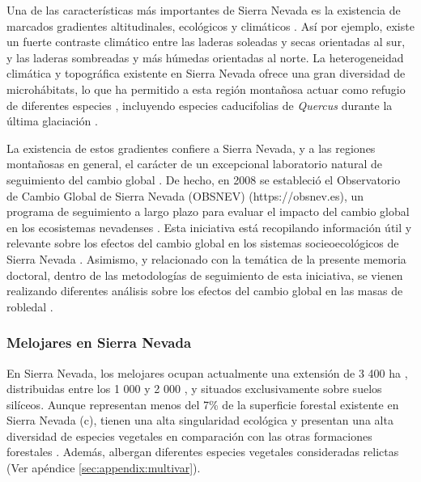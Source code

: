 Una de las características más importantes de Sierra Nevada es la existencia de marcados gradientes altitudinales, ecológicos y climáticos \autocite{Zamoraetal2021UniendoMacro}. Así por ejemplo, existe un fuerte contraste climático entre las laderas soleadas y secas orientadas al sur, y las laderas sombreadas y más húmedas orientadas al norte. La heterogeneidad climática y topográfica existente en Sierra Nevada ofrece una gran diversidad de microhábitats, lo que ha permitido a esta región montañosa actuar como refugio de diferentes especies \autocites{MedailDiadema2009GlacialRefugia,GomezLunt2007RefugiaRefugia,BlancoPastoretal2019TopographyExplains}, incluyendo especies caducifolias de \emph{Quercus} durante la última glaciación \autocites{Olaldeetal2002WhiteOaks,RodriguezSanchezetal2010TreeRange,Petitetal2002IdentificationRefugia}. 

La existencia de estos gradientes confiere a Sierra Nevada, y a las regiones montañosas en general, el carácter de un excepcional laboratorio natural de seguimiento del cambio global \autocite{Zamora2010AreasProtegidas,Zamoraetal2017MonitoringGlobal}. De hecho, en 2008 se estableció el Observatorio de Cambio Global de Sierra Nevada (OBSNEV) (https://obsnev.es), un programa de seguimiento a largo plazo para evaluar el impacto del cambio global en los ecosistemas nevadenses \autocites{Aspizuaetal2010ObservatorioCambio,BonetGarciaetal2011SierraNevada}. Esta iniciativa está recopilando información útil y relevante sobre los efectos del cambio global en los sistemas socieoecológicos de Sierra Nevada \autocites{Zamoraetal2015HuellaCambio,Zamoraetal2017GlobalChange,PerezLuqueetal2016SenalesCambio, RamosLosadaetal2017TenYears}. Asimismo, y relacionado con la temática de la presente memoria doctoral, dentro de las metodologías de seguimiento de esta iniciativa, se vienen realizando diferentes análisis sobre los efectos del cambio global en las masas de robledal \autocites[ver por ejemplo][]{BonetGarciaetal2015ImpactosCambio,Aspizuaetal2012EvaluacionGestion,Munoz2012BosquesAutoctonos}. 

\subsubsection{Melojares en Sierra Nevada}
\label{sec:metodologia:qpsn}

En Sierra Nevada, los melojares ocupan actualmente una extensión de 3 400 ha \autocite{PerezLuqueetal2019MapEcosystems}, distribuidas entre los 1 000 y 2 000 \elev, y situados exclusivamente sobre suelos silíceos. 
Aunque representan menos del 7\% de la superficie forestal existente en Sierra
Nevada (c), tienen una alta singularidad ecológica y presentan una alta diversidad de especies vegetales en comparación con las otras formaciones forestales \autocite{GomezAparicioetal2009ArePine,PerezLuqueetal2014SinfonevadaDataset}. Además, albergan diferentes especies vegetales consideradas relictas \autocite{Loriteetal2008PhytosociologicalReview, Blancaetal1998ThreatenedVascular} (Ver apéndice \ref{sec:appendix:multivar}). 

